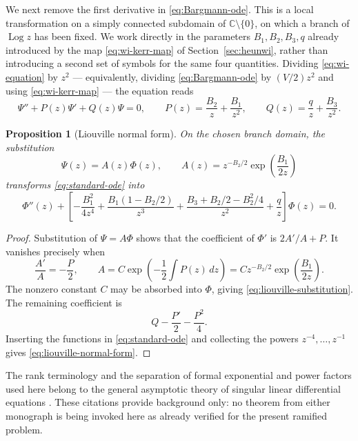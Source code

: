 \documentclass[11pt]{article}
\newtheorem{proposition}[theorem]{Proposition}
\theoremstyle{remark}
\newcommand{\C}{\mathbb{C}}
\begin{document}
We next remove the first derivative in \eqref{eq:Bargmann-ode}.  This is a
local transformation on a simply connected subdomain of \(\C\setminus\{0\}\),
on which a branch of \(\operatorname{Log} z\) has been fixed.  We work
directly in the parameters \(B_1,B_2,B_3,q\) already introduced by the map
\eqref{eq:wi-kerr-map} of Section~\ref{sec:heunwi}, rather than introducing a
second set of symbols for the same four quantities.  Dividing
\eqref{eq:wi-equation} by \(z^2\) --- equivalently, dividing
\eqref{eq:Bargmann-ode} by \((V/2)z^2\) and using \eqref{eq:wi-kerr-map} ---
the equation reads
\begin{equation}
 \Psi''+P(z)\Psi'+Q(z)\Psi=0,
 \qquad
 P(z)=\frac{B_2}{z}+\frac{B_1}{z^2},
 \qquad
 Q(z)=\frac{q}{z}+\frac{B_3}{z^2}.
 \label{eq:standard-ode}
\end{equation}

\begin{proposition}[Liouville normal form]
On the chosen branch domain, the substitution
\begin{equation}
 \Psi(z)=A(z)\Phi(z),
 \qquad
 A(z)=z^{-B_2/2}\exp\!\left(\frac{B_1}{2z}\right)
 \label{eq:liouville-substitution}
\end{equation}
transforms \eqref{eq:standard-ode} into
\begin{equation}
 \Phi''(z)+\left[
 -\frac{B_1^2}{4z^4}
 +\frac{B_1(1-B_2/2)}{z^3}
 +\frac{B_3+B_2/2-B_2^2/4}{z^2}
 +\frac{q}{z}
 \right]\Phi(z)=0.
 \label{eq:liouville-normal-form}
\end{equation}
\end{proposition}

\begin{proof}
Substitution of \(\Psi=A\Phi\) shows that the coefficient of \(\Phi'\) is
\(2A'/A+P\).  It vanishes precisely when
\begin{equation}
 \frac{A'}{A}=-\frac{P}{2},
 \qquad
 A=C\exp\!\left(-\frac12\int P(z)\,dz\right)
   =Cz^{-B_2/2}\exp\!\left(\frac{B_1}{2z}\right).
\end{equation}
The nonzero constant \(C\) may be absorbed into \(\Phi\), giving
\eqref{eq:liouville-substitution}.  The remaining coefficient is
\begin{equation}
 Q-\frac{P'}{2}-\frac{P^2}{4}.
\end{equation}
Inserting the functions in \eqref{eq:standard-ode} and collecting the powers
\(z^{-4},\ldots,z^{-1}\) gives \eqref{eq:liouville-normal-form}.
\end{proof}

The rank terminology and the separation of formal exponential and power
factors used here belong to the general asymptotic theory of singular linear
differential equations \cite{Olver1997Asymptotics,Fedoryuk1993Asymptotic}.
These citations provide background only: no theorem from either monograph is
being invoked here as already verified for the present ramified problem.
\end{document}

